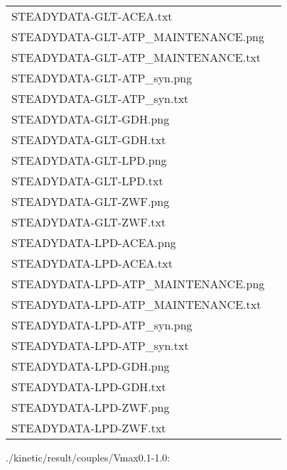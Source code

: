 \documentclass[a4paper, parskip=full]{scrreprt}
\begin{document}
\begin{longtable}{ll}
STEADYDATA-GLT-ACEA.txt\\
STEADYDATA-GLT-ATP\_MAINTENANCE.png\\
STEADYDATA-GLT-ATP\_MAINTENANCE.txt\\
STEADYDATA-GLT-ATP\_syn.png\\
STEADYDATA-GLT-ATP\_syn.txt\\
STEADYDATA-GLT-GDH.png\\
STEADYDATA-GLT-GDH.txt\\
STEADYDATA-GLT-LPD.png\\
STEADYDATA-GLT-LPD.txt\\
STEADYDATA-GLT-ZWF.png\\
STEADYDATA-GLT-ZWF.txt\\
STEADYDATA-LPD-ACEA.png\\
STEADYDATA-LPD-ACEA.txt\\
STEADYDATA-LPD-ATP\_MAINTENANCE.png\\
STEADYDATA-LPD-ATP\_MAINTENANCE.txt\\
STEADYDATA-LPD-ATP\_syn.png\\
STEADYDATA-LPD-ATP\_syn.txt\\
STEADYDATA-LPD-GDH.png\\
STEADYDATA-LPD-GDH.txt\\
STEADYDATA-LPD-ZWF.png\\
STEADYDATA-LPD-ZWF.txt
\end{longtable}

./kinetic/result/couples/Vmax0.1-1.0:
\end{document}

